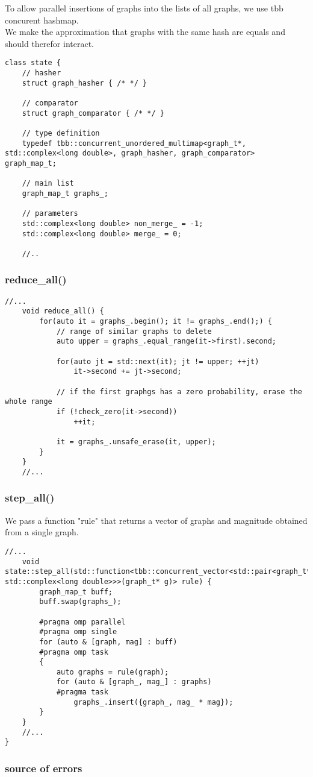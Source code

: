 \documentclass[11pt]{article}
\begin{document}
To allow parallel insertions of graphs into the lists of all graphs, we use tbb concurent hashmap. \\

We make the approximation that graphs with the same hash are equals and should therefor interact.

\begin{lstlisting}[style=CStyle]
class state {
	// hasher
	struct graph_hasher { /* */ }

	// comparator
	struct graph_comparator { /* */ }

	// type definition
	typedef tbb::concurrent_unordered_multimap<graph_t*, std::complex<long double>, graph_hasher, graph_comparator> graph_map_t;

	// main list 
	graph_map_t graphs_;

	// parameters
	std::complex<long double> non_merge_ = -1;
	std::complex<long double> merge_ = 0;
	
	//..
\end{lstlisting}

\subsubsection{reduce\_all()}

\begin{lstlisting}[style=CStyle]
	//...
	void reduce_all() {
		for(auto it = graphs_.begin(); it != graphs_.end();) {
			// range of similar graphs to delete
			auto upper = graphs_.equal_range(it->first).second;

			for(auto jt = std::next(it); jt != upper; ++jt)
		    	it->second += jt->second;

			// if the first graphgs has a zero probability, erase the whole range
			if (!check_zero(it->second))
				++it;
			
			it = graphs_.unsafe_erase(it, upper);
		}
	}
	//...
\end{lstlisting}

\subsubsection{step\_all()}

We pass a function "rule" that returns a vector of graphs and magnitude obtained from a single graph.

\begin{lstlisting}[style=CStyle]
	//...
	void state::step_all(std::function<tbb::concurrent_vector<std::pair<graph_t*, std::complex<long double>>>(graph_t* g)> rule) {
		graph_map_t buff;
		buff.swap(graphs_);

		#pragma omp parallel
		#pragma omp single
		for (auto & [graph, mag] : buff)
		#pragma omp task
		{
			auto graphs = rule(graph);
			for (auto & [graph_, mag_] : graphs)
			#pragma task
	  			graphs_.insert({graph_, mag_ * mag});
		}
	}
	//...
}
\end{lstlisting}

\subsubsection{source of errors}
\end{document}
